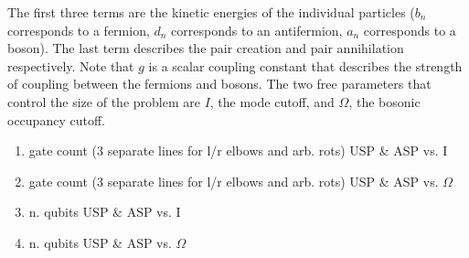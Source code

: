 The first three terms are the kinetic energies of the individual particles ($b_n$ corresponds to a fermion, $d_n$ corresponds to an antifermion, $a_n$ corresponds to a boson). The last term describes the pair creation and pair annihilation respectively. Note that $g$ is a scalar coupling constant that describes the strength of coupling between the fermions and bosons. 
The two free parameters that control the size of the problem are $I$, the mode cutoff, and $\Omega$, the bosonic occupancy cutoff. 
 \begin{enumerate}
    \item gate count (3 separate lines for l/r elbows and arb. rots) USP \& ASP vs. I 
    \item gate count (3 separate lines for l/r elbows and arb. rots) USP \& ASP vs. $\Omega$
    \item n. qubits USP \& ASP vs. I
    \item n. qubits USP \& ASP vs. $\Omega$
\end{enumerate}




